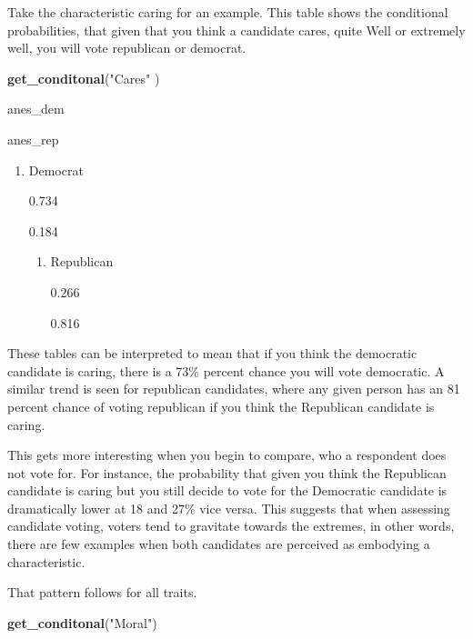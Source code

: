 \documentclass[
]{article}
\newenvironment{Shaded}{\begin{snugshade}}{\end{snugshade}}
\newcommand{\KeywordTok}[1]{\textcolor[rgb]{0.13,0.29,0.53}{\textbf{#1}}}
\newcommand{\NormalTok}[1]{#1}
\newcommand{\StringTok}[1]{\textcolor[rgb]{0.31,0.60,0.02}{#1}}
\providecommand{\tightlist}{%
  \setlength{\itemsep}{0pt}\setlength{\parskip}{0pt}}
\begin{document}
Take the characteristic caring for an example. This table shows the
conditional probabilities, that given that you think a candidate cares,
quite Well or extremely well, you will vote republican or democrat.

\begin{Shaded}
\begin{Highlighting}[]
\KeywordTok{get_conditonal}\NormalTok{(}\StringTok{"Cares"}\NormalTok{ )}
\end{Highlighting}
\end{Shaded}

anes\_dem

anes\_rep

\begin{enumerate}
\def\labelenumi{\arabic{enumi}.}
\tightlist
\item
  Democrat

  {0.734}

  {0.184}

  \begin{enumerate}
  \def\labelenumii{\arabic{enumii}.}
  \setcounter{enumii}{1}
  \tightlist
  \item
    Republican

    {0.266}

    {0.816}
  \end{enumerate}
\end{enumerate}

These tables can be interpreted to mean that if you think the democratic
candidate is caring, there is a 73\% percent chance you will vote
democratic. A similar trend is seen for republican candidates, where any
given person has an 81 percent chance of voting republican if you think
the Republican candidate is caring.

This gets more interesting when you begin to compare, who a respondent
does not vote for. For instance, the probability that given you think
the Republican candidate is caring but you still decide to vote for the
Democratic candidate is dramatically lower at 18 and 27\% vice versa.
This suggests that when assessing candidate voting, voters tend to
gravitate towards the extremes, in other words, there are few examples
when both candidates are perceived as embodying a characteristic.

That pattern follows for all traits.

\begin{Shaded}
\begin{Highlighting}[]
\KeywordTok{get_conditonal}\NormalTok{(}\StringTok{"Moral"}\NormalTok{)}
\end{Highlighting}
\end{Shaded}
\end{document}
